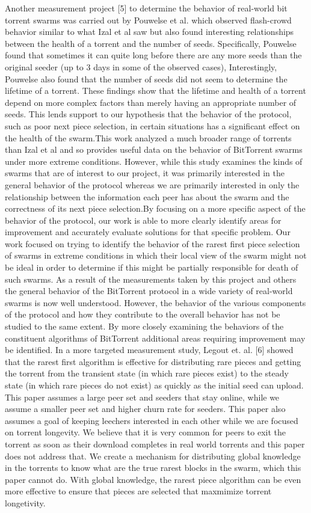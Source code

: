     Another measurement project [5] to determine the behavior of real-world bit torrent swarms was carried out by Pouwelse et al. which observed flash-crowd behavior similar to what Izal et al saw but also found interesting relationships between the health of a torrent and the number of seeds. Specifically, Pouwelse found that sometimes it can quite long before there are any more seeds than the original seeder (up to 3 days in some of the observed cases), Interestingly, Pouwelse also found that the number of seeds did not seem to determine the lifetime of a torrent. These findings show that the lifetime and health of a torrent depend on more complex factors than merely having an appropriate number of seeds. This lends support to our hypothesis that the behavior of the protocol, such as poor next piece selection, in certain situations has a significant effect on the health of the swarm.This work analyzed a much broader range of torrents than Izal et al and so provides useful data on the behavior of BitTorrent swarms under more extreme conditions. However, while this study examines the kinds of swarms that are of interest to our project, it was primarily interested in the general behavior of the protocol whereas we are primarily interested in only the relationship between the information each peer has about the swarm and the correctness of its next piece selection.By focusing on a more specific aspect of the behavior of the protocol, our work is able to more clearly identify areas for improvement and accurately evaluate solutions for that specific problem. Our work focused on trying to identify the behavior of the rarest first piece selection of swarms in extreme conditions in which their local view of the swarm might not be ideal in order to determine if this might be partially responsible for death of such swarms. As a result of the measurements taken by this project and others the general behavior of the BitTorrent protocol in a wide variety of real-world swarms is now well understood. However, the behavior of the various components of the protocol and how they contribute to the overall behavior has not be studied to the same extent. By more closely examining the behaviors of the constituent algorithms of BitTorrent additional areas requiring improvement may be identified. 
    In a more targeted measurement study, Legout et. al. [6] showed that the rarest first algorithm is effective for distributing rare pieces and getting the torrent from the transient state (in which rare pieces exist) to the steady state (in which rare pieces do not exist) as quickly as the initial seed can upload. This paper assumes a large peer set and seeders that stay online, while we assume a smaller peer set and higher churn rate for seeders. This paper also assumes a goal of keeping leechers interested in each other while we are focused on torrent longevity. We believe that it is very common for peers to exit the torrent as soon as their download completes in real world torrents and this paper does not address that. We create a mechanism for distributing global knowledge in the torrents to know what are the true rarest blocks in the swarm, which this paper cannot do. With global knowledge, the rarest piece algorithm can be even more effective to ensure that pieces are selected that maxmimize torrent longetivity.
